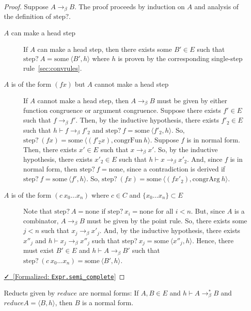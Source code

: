 \documentclass{lmcs}
\newcommand{\step}{\text{step?}}
\newcommand{\none}{\text{none}}
\newcommand{\congrfun}{\text{congrFun}}
\newcommand{\congrarg}{\text{congrArg}}
\newcommand{\some}{\text{some}}
\newcommand{\leanlink}[2]{
  \href{#1}{\textcolor{black}\faCheck~[Formalized: \texttt{#2}]}%
}
\newcommand{\arr}{\rightarrow}
\newcommand{\barr}{\arr_{\beta}}
\begin{document}
\begin{proof}
  Suppose \(A \barr B\). The proof proceeds by induction on \(A\) and analysis of the definition of \(\step\).
  \begin{description}
    \item[\(A\) can make a head step] If \(A\) can make a head step, then there exists some \(B' \in E\) such that \(\step\ A = \some\ \langle B', h \rangle\) where \(h\) is proven by the corresponding single-step rule~\ref{sec:convrules}.
    \item[\(A\) is of the form \((f x)\) but \(A\) cannot make a head step] If \(A\) cannot make a head step, then \(A \barr B\) must be given by either function congruence or argument congruence. Suppose there exists \(f' \in E\) such that \(f \barr f'\). Then, by the inductive hypothesis, there exists \(f'_2 \in E\) such that \(h \vdash f \barr f'_2\) and \(\step\ f = \some\ \langle f'_2, h \rangle\). So, \(\step\ (f x) = \some\ \langle (f'_2 x), \congrfun\ h \rangle\). Suppose \(f\) is in normal form. Then, there exists \(x' \in E\) such that \(x \barr x'\). So, by the inductive hypothesis, there exists \(x'_2 \in E\) such that \(h \vdash x \barr x'_2\). And, since \(f\) is in normal form, then \(\step\ f = \none\), since a contradiction is derived if \(\step\ f = \some\ \langle f', h \rangle\). So, \(\step\ (f x) = \some\ \langle (f x'_2), \congrarg\ h \rangle\).
    \item[\(A\) is of the form \((c\ x_0 \ldots x_n)\) where \(c \in C\) and \(\{x_0 \ldots x_n\} \subset E\)]
      
      Note that \(\step\ A = \none\) if \(\step\ x_i = \none\) for all \(i < n\). But, since \(A\) is a combinator, \(A \barr B\) must be given by the point rule. So, there exists some \(j < n\) such that \(x_j \barr x'_j\). And, by the inductive hypothesis, there exists \(x''_j\) and \(h \vdash x_j \barr x''_j\) such that \(\step\ x_j = \some\ \langle x''_j, h \rangle\). Hence, there must exist \(B' \in E\) and \(h \vdash A \barr B'\) such that \(\step\ (c\ x_0 \ldots x_n) = \some\ \langle B', h \rangle\).
    \end{description}
    \noindent \leanlink{https://github.com/lexzaiello/DCC/blob/fb7acf6d9644df7d13c809d12609b59eaca5c763/Dcc/Red/Complete.lean\#L7}{Expr.semi\_complete}
\end{proof}

\begin{thm}\label{thm:reducenorm}
  Reducts given by \(reduce\) are normal forms: If \(A, B \in E\) and \(h \vdash A \barr^{*} B\) and \(reduce A = \langle B, h \rangle\), then \(B\) is a normal form.
\end{thm}
\end{document}
